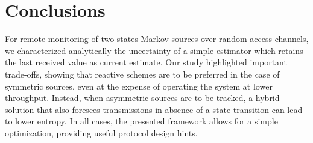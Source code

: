 \section{Conclusions}
For remote monitoring of two-states Markov sources over random access channels, we characterized analytically the uncertainty of a simple estimator which retains the last received value as current estimate. Our study highlighted important trade-offs, showing that reactive schemes are to be preferred in the case of symmetric sources, even at the expense of operating the system at lower throughput. Instead, when asymmetric sources are to be tracked, a hybrid solution that also foresees transmissions in absence of a state transition can lead to lower entropy. In all cases, the presented framework allows for a simple optimization, providing useful protocol design hints.